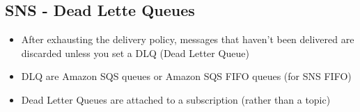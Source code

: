 \subsection{SNS - Dead Lette Queues}
\begin{itemize}
    \item After exhausting the delivery policy, messages that haven't been delivered are discarded unless you set a DLQ (Dead Letter Queue)
    \item DLQ are Amazon SQS queues or Amazon SQS FIFO queues (for SNS FIFO)
    \item Dead Letter Queues are attached to a subscription (rather than a topic)
\end{itemize}

